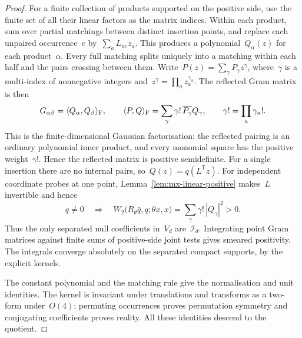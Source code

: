 \begin{proof}
For a finite collection of products supported on the positive side, use the finite set of all their linear factors as the matrix indices.
Within each product, sum over partial matchings between distinct insertion points, and replace each unpaired occurrence~$e$ by~$\sum_aL_{ae}z_a$.
This produces a polynomial~$Q_\alpha(z)$ for each product~$\alpha$.
Every full matching splits uniquely into a matching within each half and the pairs crossing between them.
Write~$P(z)=\sum_\gamma P_\gamma z^\gamma$, where~$\gamma$ is a multi-index of nonnegative integers and~$z^\gamma=\prod_a z_a^{\gamma_a}$.
The reflected Gram matrix is then
\begin{equation}\label{eq:mx-fock}
 G_{\alpha\beta}
 =\langle Q_\alpha,Q_\beta\rangle_{\rm F},
 \qquad
 \langle P,Q\rangle_{\rm F}
 =\sum_\gamma\gamma!\,\overline{P_\gamma}Q_\gamma,
 \qquad \gamma!=\prod_a\gamma_a!.
\end{equation}
This is the finite-dimensional Gaussian factorisation: the reflected pairing is an ordinary polynomial inner product, and every monomial square has the positive weight~$\gamma!$. Hence the reflected matrix is positive semidefinite.
For a single insertion there are no internal pairs, so~$Q(z)=q(L^{\mathsf T}z)$.
For independent coordinate probes at one point, Lemma~\ref{lem:mx-linear-positive} makes~$L$ invertible and hence
\begin{equation}\label{eq:mx-strict}
 q\ne0\quad\Longrightarrow\quad
 W_2\bigl(R_\theta\bar q,q;\theta x,x\bigr)
 =\sum_\gamma\gamma!\,|Q_\gamma|^2>0.
\end{equation}
Thus the only separated null coefficients in~$V_d$ are~$\mathcal I_d$.
Integrating point Gram matrices against finite sums of positive-side joint tests gives smeared positivity.
The integrals converge absolutely on the separated compact supports, by the explicit kernels.

The constant polynomial and the matching rule give the normalisation and unit identities.
The kernel is invariant under translations and transforms as a two-form under~$O(4)$; permuting occurrences proves permutation symmetry and conjugating coefficients proves reality.
All these identities descend to the quotient.


\end{proof}
